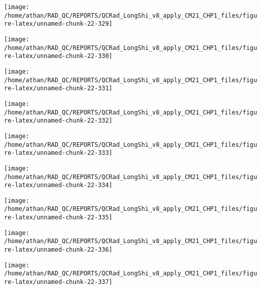 \documentclass[
  10pt,
  a4paper,oneside]{article}
\begin{document}
\begin{center}\texttt{[image: /home/athan/RAD\_QC/REPORTS/QCRad\_LongShi\_v8\_apply\_CM21\_CHP1\_files/figure-latex/unnamed-chunk-22-329]} \end{center}

\begin{center}\texttt{[image: /home/athan/RAD\_QC/REPORTS/QCRad\_LongShi\_v8\_apply\_CM21\_CHP1\_files/figure-latex/unnamed-chunk-22-330]} \end{center}

\begin{center}\texttt{[image: /home/athan/RAD\_QC/REPORTS/QCRad\_LongShi\_v8\_apply\_CM21\_CHP1\_files/figure-latex/unnamed-chunk-22-331]} \end{center}

\begin{center}\texttt{[image: /home/athan/RAD\_QC/REPORTS/QCRad\_LongShi\_v8\_apply\_CM21\_CHP1\_files/figure-latex/unnamed-chunk-22-332]} \end{center}

\begin{center}\texttt{[image: /home/athan/RAD\_QC/REPORTS/QCRad\_LongShi\_v8\_apply\_CM21\_CHP1\_files/figure-latex/unnamed-chunk-22-333]} \end{center}

\begin{center}\texttt{[image: /home/athan/RAD\_QC/REPORTS/QCRad\_LongShi\_v8\_apply\_CM21\_CHP1\_files/figure-latex/unnamed-chunk-22-334]} \end{center}

\begin{center}\texttt{[image: /home/athan/RAD\_QC/REPORTS/QCRad\_LongShi\_v8\_apply\_CM21\_CHP1\_files/figure-latex/unnamed-chunk-22-335]} \end{center}

\begin{center}\texttt{[image: /home/athan/RAD\_QC/REPORTS/QCRad\_LongShi\_v8\_apply\_CM21\_CHP1\_files/figure-latex/unnamed-chunk-22-336]} \end{center}

\begin{center}\texttt{[image: /home/athan/RAD\_QC/REPORTS/QCRad\_LongShi\_v8\_apply\_CM21\_CHP1\_files/figure-latex/unnamed-chunk-22-337]} \end{center}
\end{document}
